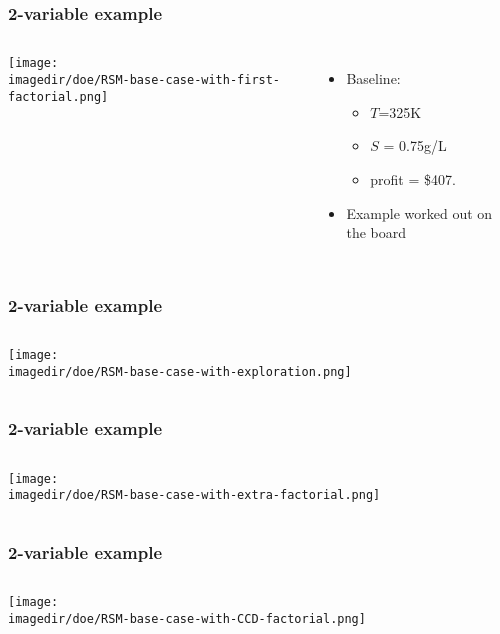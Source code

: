 \begin{frame}\frametitle{2-variable example}
	\begin{columns}
		\column{6cm}
			\begin{center}
				\texttt{[image: \\imagedir/doe/RSM-base-case-with-first-factorial.png]}
			\end{center}
		\column{4cm}
			\begin{itemize}
				\item	Baseline:
				\begin{itemize}
					\item	$T$=325K
					\item	$S$ = 0.75g/L
					\item	profit = \$407.
				\end{itemize}
				\item	Example worked out on the board
			\end{itemize}
	\end{columns}
\end{frame}

\begin{frame}\frametitle{2-variable example}
	\begin{columns}
		\column{6cm}
			\begin{center}
				\texttt{[image: \\imagedir/doe/RSM-base-case-with-exploration.png]}
			\end{center}
		\column{4cm}
	\end{columns}
\end{frame}

\begin{frame}\frametitle{2-variable example}
	\begin{columns}
		\column{6cm}
			\begin{center}
				\texttt{[image: \\imagedir/doe/RSM-base-case-with-extra-factorial.png]}
			\end{center}
	 	\column{4cm}
	\end{columns}
\end{frame}

\begin{frame}\frametitle{2-variable example}
	\begin{columns}
		\column{6cm}
			\begin{center}
				\texttt{[image: \\imagedir/doe/RSM-base-case-with-CCD-factorial.png]} 
			\end{center}
		\column{4cm}
	\end{columns}
\end{frame}

